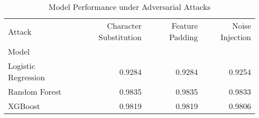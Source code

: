 \begin{table}
\caption{Model Performance under Adversarial Attacks}
\label{tab:adv_accuracy}
\begin{tabular}{lrrr}
\toprule
Attack & Character Substitution & Feature Padding & Noise Injection \\
Model &  &  &  \\
\midrule
Logistic Regression & 0.9284 & 0.9284 & 0.9254 \\
Random Forest & 0.9835 & 0.9835 & 0.9833 \\
XGBoost & 0.9819 & 0.9819 & 0.9806 \\
\bottomrule
\end{tabular}
\end{table}
